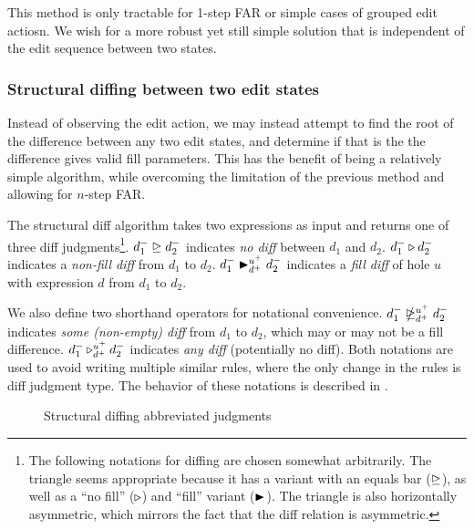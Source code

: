 This method is only tractable for 1-step FAR or simple cases of grouped edit actiosn. We wish for a more robust yet still simple solution that is independent of the edit sequence between two states.

\subsubsection{Structural diffing between two edit states}
\label{sec:far-detect-structural-diff}

Instead of observing the edit action, we may instead attempt to find the root of the difference between any two edit states, and determine if that is the the difference gives valid fill parameters. This has the benefit of being a relatively simple algorithm, while overcoming the limitation of the previous method and allowing for $n$-step FAR.

The structural diff algorithm takes two expressions as input and returns one of three diff judgments\footnote{The following notations for diffing are chosen somewhat arbitrarily. The triangle seems appropriate because it has a variant with an equals bar ($\nodiff{}{}$), as well as a ``no fill'' ($\nfdiff{}{}{}{}$) and ``fill'' variant ($\fdiff{}{}{}{}$). The triangle is also horizontally asymmetric, which mirrors the fact that the diff relation is asymmetric.}. $\nodiff{d_1^-}{d_2^-}$ indicates \textit{no diff} between $d_1$ and $d_2$. $\nfdiff{d_1^-}{d_2^-}$ indicates a \textit{non-fill diff} from $d_1$ to $d_2$. $\fdiff{d_1^-}{d_2^-}{u^+}{d^+}$ indicates a \textit{fill diff} of hole $u$ with expression $d$ from $d_1$ to $d_2$.

We also define two shorthand operators for notational convenience. $\sdiff{d_1^-}{d_2^-}{u^+}{d^+}$ indicates \textit{some (non-empty) diff} from $d_1$ to $d_2$, which may or may not be a fill difference. $\adiff{d_1^-}{d_2^-}{u^+}{d^+}$ indicates \textit{any diff} (potentially no diff). Both notations are used to avoid writing multiple similar rules, where the only change in the rules is diff judgment type. The behavior of these notations is described in .

\begin{figure}
  \centering
  \begin{mdframed}
    \begin{singlespace}
      
    \end{singlespace}
  \end{mdframed}
  \caption{Structural diffing abbreviated judgments}
  \label{fig:diff-abbrev}
\end{figure}

